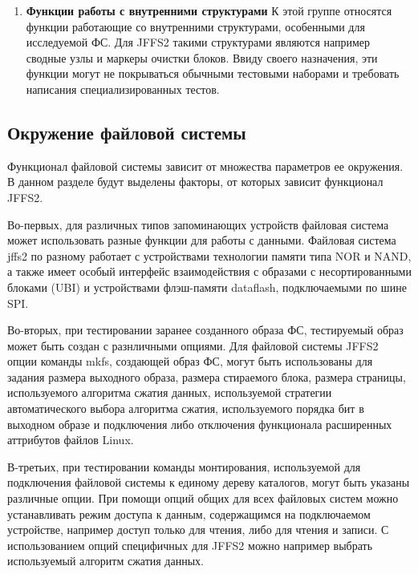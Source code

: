 \begin{enumerate}
	\item \textbf{Функции работы с внутренними структурами}
	К этой группе относятся функции работающие со внутренними структурами, особенными для исследуемой ФС. Для JFFS2 такими структурами являются например сводные узлы и маркеры очистки блоков. Ввиду своего назначения, эти функции могут не покрываться обычными тестовыми наборами и требовать написания специализированных тестов.
\end{enumerate}

\subsection{Окружение файловой системы}

Функционал файловой системы зависит от множества параметров ее окружения. В данном разделе будут выделены факторы, от которых зависит функционал JFFS2.

Во-первых, для различных типов запоминающих устройств файловая система может использовать разные функции для работы с данными. Файловая система jffs2 по разному работает с устройствами технологии памяти типа NOR и NAND, а также имеет особый интерфейс взаимодействия с образами с несортированными блоками (UBI) и устройствами флэш-памяти dataflash, подключаемыми по шине SPI. 

Во-вторых, при тестировании заранее созданного образа ФС, тестируемый образ может быть создан с разнличными опциями. Для файловой системы JFFS2 опции команды mkfs, создающей образ ФС, могут быть использованы для задания размера выходного образа, размера стираемого блока, размера страницы, используемого алгоритма сжатия данных, используемой стратегии автоматического выбора алгоритма сжатия, используемого порядка бит в выходном образе и подключения либо отключения функционала расширенных аттрибутов файлов Linux. 

В-третьих, при тестировании команды монтирования, используемой для подключения файловой системы к единому дереву каталогов, могут быть указаны различные опции. При помощи опций общих для всех файловых систем можно устанавливать режим доступа к данным, содержащимся на подключаемом устройстве, например доступ только для чтения, либо для чтения и записи. С использованием опций специфичных для JFFS2 можно например выбрать используемый алгоритм сжатия данных.

